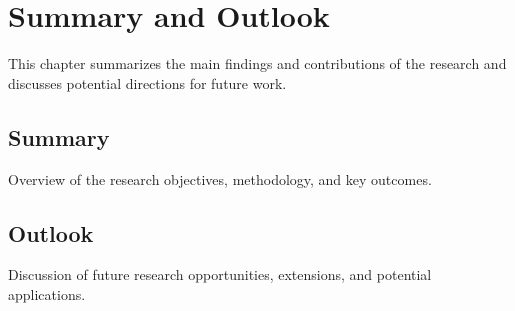 \chapter{Summary and Outlook}
\label{chap:summary}

This chapter summarizes the main findings and contributions of the research and discusses potential directions for future work.

\section{Summary}
Overview of the research objectives, methodology, and key outcomes.

\section{Outlook}
Discussion of future research opportunities, extensions, and potential applications.
